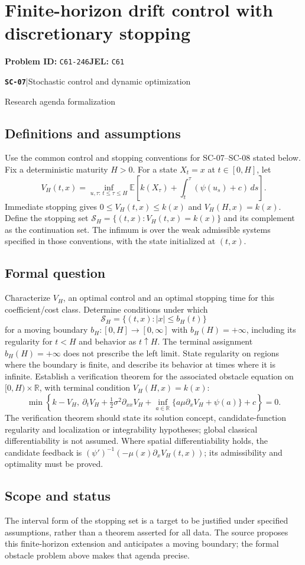 \documentclass[11pt,a4paper]{article}
\newcommand{\R}{\mathbb R}
\newcommand{\E}{\mathbb E}
\newcommand{\entrymeta}[3]{{\sffamily\small\color{muted}\textbf{\texttt{#1}}\quad|\quad #2\par #3\par}}
\begin{document}
\section*{Finite-horizon drift control with discretionary stopping}
\textbf{Problem ID:} \texttt{C61-246}\quad \textbf{JEL:} \texttt{C61}\par
\label{problem:OP-0568}
\label{beyond:SC-07}
\entrymeta{SC-07}{Stochastic control and dynamic optimization}{Research agenda formalization}
\subsection*{Definitions and assumptions}
Use the common control and stopping conventions for SC-07--SC-08 stated below. Fix a deterministic
maturity $H>0$. For a state $X_t=x$ at $t\in[0,H]$, let
\[
 V_H(t,x)=\inf_{u,\tau:\,t\leq\tau\leq H}
 \E\left[k(X_\tau)+\int_t^\tau(\psi(u_s)+c)\,ds\right].
\]
Immediate stopping gives $0\leq V_H(t,x)\leq k(x)$ and
$V_H(H,x)=k(x)$. Define the stopping set
$\mathcal S_H=\{(t,x):V_H(t,x)=k(x)\}$ and its complement as the
continuation set. The infimum is over the weak admissible systems specified
in those conventions, with the state initialized at $(t,x)$.
\subsection*{Formal question}
Characterize $V_H$, an optimal control and an optimal stopping time for
this coefficient/cost class. Determine conditions under which
\[
 \mathcal S_H=\{(t,x):|x|\leq b_H(t)\}
\]
for a moving boundary $b_H:[0,H]\to[0,\infty]$ with
$b_H(H)=+\infty$, including its regularity for $t<H$ and behavior as
$t\uparrow H$. The terminal assignment $b_H(H)=+\infty$ does not
prescribe the left limit. State regularity on regions where the boundary
is finite, and describe its behavior at times where it is infinite.
Establish a verification theorem for the associated
obstacle equation on $[0,H)\times\R$, with terminal condition
$V_H(H,x)=k(x)$:
\[
 \min\left\{k-V_H,\ \partial_tV_H+
 \tfrac12\sigma^2\partial_{xx}V_H+
 \inf_{a\in\R}\{a\mu\partial_xV_H+\psi(a)\}+c\right\}=0.
\]
The verification theorem should state its solution concept,
candidate-function regularity and localization or integrability hypotheses;
global classical differentiability is not assumed.
Where spatial differentiability holds, the candidate feedback is
$(\psi')^{-1}(-\mu(x)\partial_xV_H(t,x))$; its admissibility and
optimality must be proved.
\subsection*{Scope and status}
The interval form of the stopping set is a target to be justified under
specified assumptions, rather than a theorem asserted for all data.
The source proposes this finite-horizon extension and anticipates a moving
boundary; the formal obstacle problem above makes that agenda precise.
\end{document}

